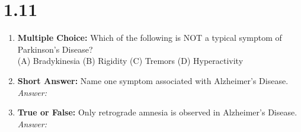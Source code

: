 \section*{1.11 \squigglyline}
\begin{enumerate}[label=\textbf{Q1.11.\arabic*}]
      \item \textbf{Multiple Choice:} Which of the following is NOT a typical symptom of Parkinson's Disease? \\
            (A) Bradykinesia \quad (B) Rigidity \quad (C) Tremors \quad (D) Hyperactivity

      \item \textbf{Short Answer:} Name one symptom associated with Alzheimer’s Disease. \\
            \textit{Answer:} %

      \item \textbf{True or False:} Only retrograde amnesia is observed in Alzheimer's Disease. \\
            \textit{Answer:} %
\end{enumerate}
